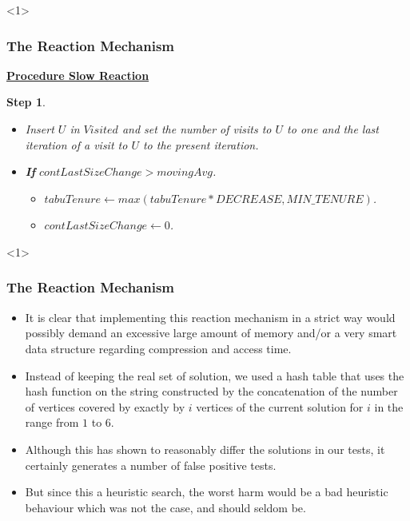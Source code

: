 \documentclass{beamer}
\newtheorem{step}{Step}
\begin{document}
\begin{frame}<1>
  \frametitle{The Reaction Mechanism}

{ \footnotesize

\begin{block}

\underline{\bf Procedure Slow Reaction}

\begin{step} 

\begin{itemize}
    \item[-] Insert $U$ in $Visited$ and set the number of visits to $U$ to one and the last iteration of a visit to $U$ to the present iteration.
    \item[-] \textbf{If} $contLastSizeChange > movingAvg$.
        \begin{itemize}
        \item[-] $tabuTenure \leftarrow max(tabuTenure * DECREASE, MIN\_TENURE)$.
        \item[-] $contLastSizeChange \leftarrow 0$.
        \end{itemize}
    \end{itemize}
\end{step}

\end{block}
}

\end{frame}

\begin{frame}<1>
  \frametitle{The Reaction Mechanism}

{ 
	\footnotesize
  \begin{itemize}
  	\item It is clear that implementing this reaction mechanism in a strict way would possibly demand an excessive large amount of memory and/or a very smart data structure regarding compression and access time.

  	
  	\item Instead of keeping the real set of solution, we used a hash table that uses the hash function on the string constructed by the concatenation of the number of vertices covered by exactly by $i$  vertices of the current solution for $i$ in the range from $1$ to $6$.
  	
  	\item Although this has shown to reasonably differ the solutions in our tests, it certainly generates a number of false positive tests.
  	
  	\item But since this a heuristic search, the worst harm would be a bad heuristic behaviour which was not the case, and should seldom be.
  	
  \end{itemize}

}
\end{frame}
\end{document}
